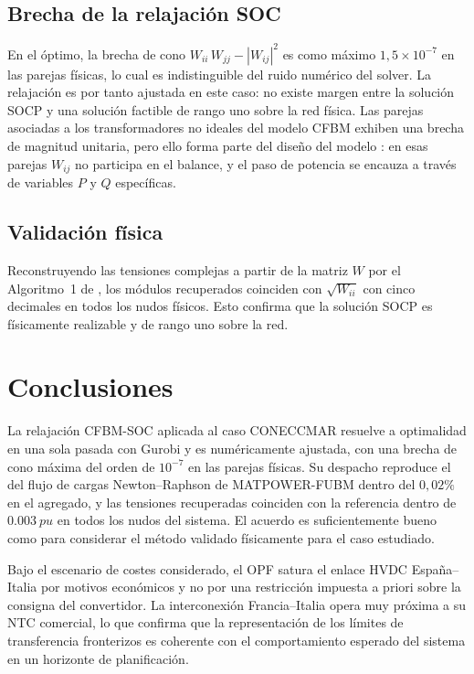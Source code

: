 \documentclass[12pt,a4paper]{iit-project-draft-report}
\begin{document}
\subsection{Brecha de la relajación SOC}

En el óptimo, la brecha de cono $W_{ii}\,W_{jj} - |W_{ij}|^2$ es como
máximo $1{,}5 \times 10^{-7}$ en las parejas físicas, lo cual es
indistinguible del ruido numérico del solver. La relajación es por
tanto ajustada en este caso: no existe margen entre la solución
\gls{SOCP} y una solución factible de rango uno sobre la red física.
Las parejas asociadas a los transformadores no ideales del modelo
\gls{CFBM} exhiben una brecha de magnitud unitaria, pero ello forma
parte del diseño del modelo \cite{HigueraGutierrez2025}: en esas parejas
$W_{ij}$ no participa en el balance, y el paso de potencia se encauza a
través de variables $P$ y $Q$ específicas.

\subsection{Validación física}

Reconstruyendo las tensiones complejas a partir de la matriz $W$ por el
Algoritmo~1 de \cite{HigueraGutierrez2025}, los módulos recuperados
coinciden con $\sqrt{W_{ii}}$ con cinco decimales en todos los nudos
físicos. Esto confirma que la solución \gls{SOCP} es físicamente
realizable y de rango uno sobre la red.

\section{Conclusiones}
\label{sec:conclusions}

La relajación \gls{CFBM}-\gls{SOC} aplicada al caso CONECCMAR resuelve a
optimalidad en una sola pasada con Gurobi y es numéricamente ajustada,
con una brecha de cono máxima del orden de $10^{-7}$ en las parejas
físicas. Su despacho reproduce el del flujo de cargas Newton--Raphson de
\gls{MATPOWER}-\gls{FUBM} dentro del $0{,}02\%$ en el agregado, y las
tensiones recuperadas coinciden con la referencia dentro de
$\SI{0.003}{pu}$ en todos los nudos del sistema. El acuerdo es
suficientemente bueno como para considerar el método validado físicamente
para el caso estudiado.

Bajo el escenario de costes considerado, el \gls{OPF} satura el enlace
\gls{HVDC} España--Italia por motivos económicos y no por una restricción
impuesta a priori sobre la consigna del convertidor. La interconexión
Francia--Italia opera muy próxima a su \gls{NTC} comercial, lo que
confirma que la representación de los límites de transferencia
fronterizos es coherente con el comportamiento esperado del sistema en
un horizonte de planificación.
\end{document}
